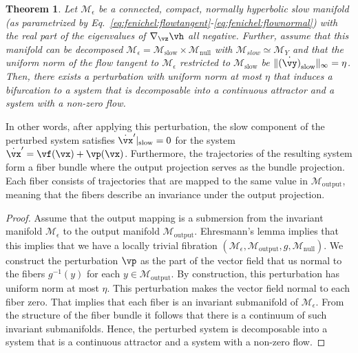 \documentclass{article} %
\newcounter{ct}
\newcommand{\manifold}{\mathcal{M}}
\newtheorem{theorem}{Theorem}
\theoremstyle{definition}
\theoremstyle{remark}
\begin{document}
\begin{theorem}\label{thrm:near_ca}
Let \(\manifold_\epsilon\) be a connected, compact, normally hyperbolic slow manifold  (as parametrized by Eq.~\eqref{eq:fenichel:flowtangent}-\eqref{eq:fenichel:flownormal}) with the real part of the eigenvalues of \(\nabla_\vz \vh\) all negative. %
Further, assume that this manifold can be decomposed \(\manifold_\epsilon= \manifold_{\text{slow}}\times \manifold_{\text{null}}\) with \(\manifold_{slow}\simeq \manifold_Y\) and that
 the uniform norm of the flow tangent to \(\manifold_\epsilon\) restricted to \(\manifold_{\text{slow}}\) be \(\|\dot{(\vy)}_{\text{slow}}\|_\infty=\eta\).
Then, there exists a perturbation with uniform norm at most \(\eta\) that induces a bifurcation to a system that is decomposable into a continuous attractor and a system with a non-zero flow.
\end{theorem}

In other words, after applying this perturbation, the slow component of the perturbed system satisfies \(\dot{\vx}'|_{\text{slow}} = 0\) for the system \(\dot{\vx}' = \vf(\vx) + \vp(\vx)\).
Furthermore, the trajectories of the resulting system form a fiber bundle where the output projection serves as the bundle projection.
Each fiber consists of trajectories that are mapped to the same value in \(\manifold_{\text{output}}\), meaning that the fibers describe an invariance under the output projection. %


\begin{proof}
Assume that the output mapping is a submersion from the invariant manifold \(\manifold_\epsilon\) to the output manifold \(\manifold_{\text{output}}\).
Ehresmann's lemma implies that this implies that we have a locally trivial fibration \((\manifold_\epsilon, \manifold_{\text{output}}, g,\manifold_{\text{null}})\).
We construct the perturbation \(\vp\) as the part of the vector field that us normal to the fibers \(g^{-1}(y)\) for each \(y\in\manifold_{\text{output}}\).
By construction, this perturbation has uniform norm at most \(\eta\).
This perturbation makes the vector field normal to each fiber zero.
That implies that each fiber is an invariant submanifold of \(\manifold_\epsilon\).
From the structure of the fiber bundle it follows that there is a continuum of such invariant submanifolds.
Hence, the perturbed system is decomposable into a system that is a continuous attractor and a system with a non-zero flow.
\end{proof}
\end{document}
